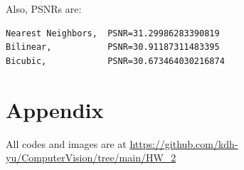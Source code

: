 \documentclass{article}
\begin{document}
Also, PSNRs are:
\begin{lstlisting}[backgroundcolor=\color{lightgray}]
Nearest Neighbors,  PSNR=31.29986283390819 
Bilinear,           PSNR=30.91187311483395 
Bicubic,            PSNR=30.673464030216874
\end{lstlisting}

\section*{Appendix}
All codes and images are at \url{https://github.com/kdh-yu/ComputerVision/tree/main/HW_2}
\end{document}
